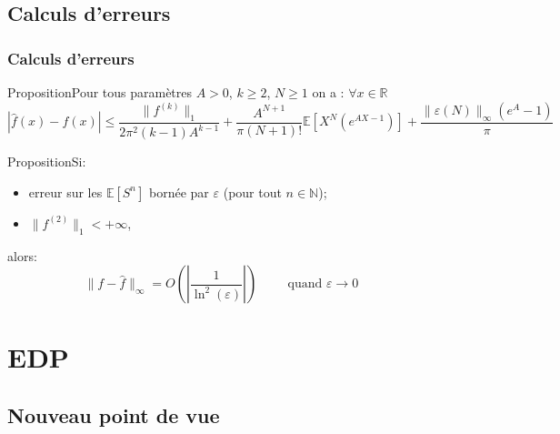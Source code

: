 \documentclass{beamer}
\newcommand{\prop}[1]{\begin{block}{Proposition}#1\end{block}}
\newcommand{\pth}[1]{\left(#1\right)}
\newcommand{\cro}[1]{\left[#1\right]}
\newcommand{\abs}[1]{\left|#1\right|}
\newcommand{\dabs}[1]{\|#1\|}
\newcommand{\comment}[1]{\hspace{1cm}\text{#1}\hspace{1cm}}
\newcommand{\Er}{\mathbb{R}}
\newcommand{\En}{\mathbb{N}}
\newcommand{\Esp}[1]{\mathbb{E}\cro{#1}}
\begin{document}
\subsection{Calculs d'erreurs}

\begin{frame}
  \frametitle{Calculs d'erreurs}
    \prop{Pour tous paramètres $A>0$, $k\geqslant 2$, $N\geqslant 1$ on a : $\forall x\in\Er$ \[\textstyle\abs{\hat{f}(x)-f(x)}\leqslant\frac{\dabs{f^{(k)}}_1}{2\pi^2(k-1)A^{k-1}}+\frac{A^{N+1}}{\pi(N+1)!}\Esp{X^N(e^{AX-1})}+\frac{\dabs{\varepsilon(N)}_{\infty}(e^A-1)}{\pi}\]
    
    }
  \pause
  \prop{Si:
    \begin{itemize}[label=$\bullet$]
    \item erreur sur les $\Esp{S^n}$ bornée par $\varepsilon$ (pour tout $n\in\En$);
    \item$\dabs{f^{(2)}}_1<+\infty$,
    \end{itemize}
    alors:
    \[\dabs{f-\hat{f}}_{\infty}=O\pth{\abs{\frac{1}{\ln^2(\varepsilon)}}}\comment{quand $\varepsilon\to 0$}\]
    }

\end{frame}

\section{EDP}

\begin{frame}
  \sectionpage
\end{frame}

\subsection{Nouveau point de vue}
\end{document}
